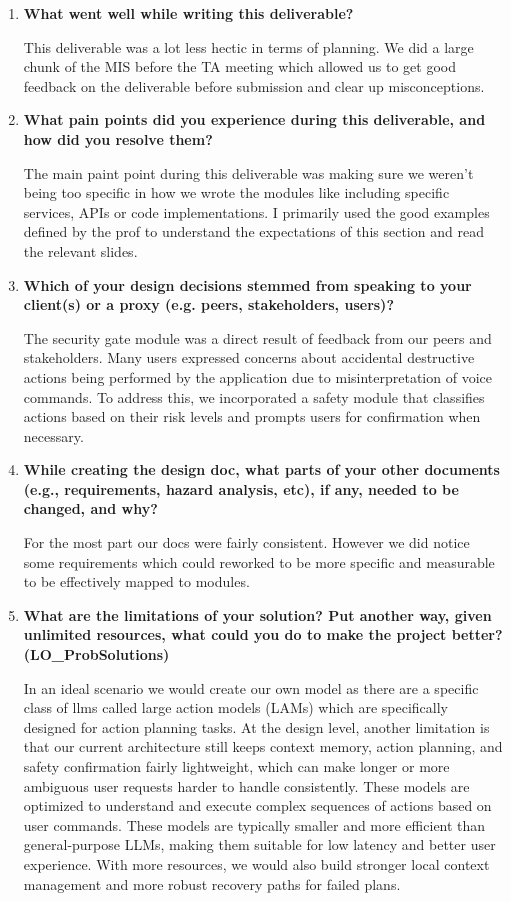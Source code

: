 \documentclass[12pt, titlepage]{article}
\begin{document}
\begin{enumerate}

\item \textbf{What went well while writing this deliverable?}

This deliverable was a lot less hectic in terms of planning. We did a large
chunk of the MIS before the TA meeting which allowed us to get good feedback on
the deliverable before submission and clear up misconceptions.

\item \textbf{What pain points did you experience during this deliverable,
and how did you resolve them?}

The main paint point during this deliverable was making sure we weren't being
too specific in how we wrote the modules like including specific services, APIs
or code implementations. I primarily used the good examples defined by the prof
to understand the expectations of this section and read the relevant slides.

\item \textbf{Which of your design decisions stemmed from speaking to your
client(s) or a proxy (e.g. peers, stakeholders, users)?}

The security gate module was a direct result of feedback from our peers and
stakeholders. Many users expressed concerns about accidental destructive actions
being performed by the application due to misinterpretation of voice commands.
To address this, we incorporated a safety module that classifies actions based
on their risk levels and prompts users for confirmation when necessary.

\item \textbf{While creating the design doc, what parts of your other
documents (e.g., requirements, hazard analysis, etc), if any, needed
to be changed, and why?}

For the most part our docs were fairly consistent. However we did notice some
requirements which could reworked to be more specific and measurable to be
effectively mapped to modules.

\item \textbf{What are the limitations of your solution? Put another way,
given unlimited resources, what could you do to make the project
better? (LO\_ProbSolutions)}

In an ideal scenario we would create our own model as there are a specific class
of llms called large action models (LAMs) which are specifically designed for
action planning tasks. At the design level, another limitation is that our current
architecture still keeps context memory, action planning, and safety confirmation
fairly lightweight, which can make longer or more ambiguous user requests harder
to handle consistently. These models are optimized to understand and execute
complex sequences of actions based on user commands. These models are typically
smaller and more efficient than general-purpose LLMs, making them suitable for
low latency and better user experience. With more resources, we would also build
stronger local context management and more robust recovery paths for failed plans.


\end{enumerate}
\end{document}
